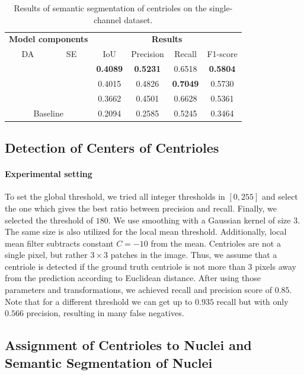 \documentclass[9pt,conference,compsocconf, article]{IEEEtran}
\newcommand{\cmark}{\ding{51}}
\newcommand{\xmark}{\ding{55}}
\begin{document}
\begin{table}[h!]
  \caption{Results of semantic segmentation of centrioles on the single-channel dataset.}
  \label{segmentation-single-channel}
  \centering

  \begin{tabular}{cccccc}
    \toprule
    \multicolumn{2}{c}{\textbf{Model components}} & \multicolumn{4}{c}{\textbf{Results}}  \\
    DA & SE & IoU & Precision & Recall & F1-score \\
    \midrule
    \cmark & \xmark & \textbf{0.4089} & \textbf{0.5231} & 0.6518 & \textbf{0.5804} \\
    \cmark & \cmark & 0.4015 & 0.4826 & \textbf{0.7049} & 0.5730 \\
    \xmark & \cmark & 0.3662 & 0.4501 & 0.6628 & 0.5361 \\   
    \midrule
     \multicolumn{2}{c}{Baseline} & 0.2094 & 0.2585 & 0.5245 & 0.3464 \\
    \bottomrule
  \end{tabular}
\end{table}


\subsection{Detection of Centers of Centrioles}
\label{results-detecting-centers}

\paragraph{Experimental setting}
To set the global threshold, we tried all integer thresholds in $[0, 255]$ and select the one which gives the best ratio between precision and recall. Finally, we selected the threshold of $180$. We use smoothing with a Gaussian kernel of size 3. The same size is also utilized for the local mean threshold. Additionally, local mean filter subtracts constant $C = -10$ from the mean. Centrioles are not a single pixel, but rather $3\times 3$ patches in the image. Thus, we assume that a centriole is detected if the ground truth centriole is not more than 3 pixels away from the prediction according to Euclidean distance. After using those parameters and transformations, we achieved recall and precision score of $0.85$. Note that for a different threshold we can get up to $0.935$ recall but with only $0.566$ precision, resulting in many false negatives.


\subsection{Assignment of Centrioles to Nuclei and Semantic Segmentation of Nuclei}
\label{results-assignment}
\end{document}
